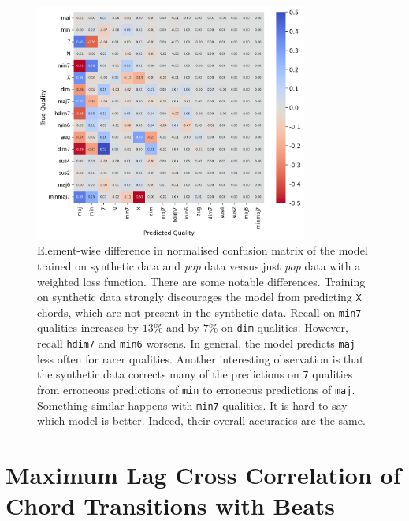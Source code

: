 \begin{figure}[H]
    \centering
    \includegraphics[width=0.8\textwidth]{figures/confusion_matrix_synth.png}
    \caption{Element-wise difference in normalised confusion matrix of the model trained on synthetic data and \emph{pop} data versus just \emph{pop} data with a weighted loss function. There are some notable differences. Training on synthetic data strongly discourages the model from predicting \texttt{X} chords, which are not present in the synthetic data. Recall on \texttt{min7} qualities increases by $13\%$ and by $7\%$ on \texttt{dim} qualities. However, recall \texttt{hdim7} and \texttt{min6} worsens. In general, the model predicts \texttt{maj} less often for rarer qualities. Another interesting observation is that the synthetic data corrects many of the predictions on \texttt{7} qualities from erroneous predictions of \texttt{min} to erroneous predictions of \texttt{maj}. Something similar happens with \texttt{min7} qualities. It is hard to say which model is better. Indeed, their overall accuracies are the same.}\label{fig:cm_synthetic_data}
\end{figure}

\section{Maximum Lag Cross Correlation of Chord Transitions with Beats}\label{app:maximum_lag_cross_correlation_beats}


